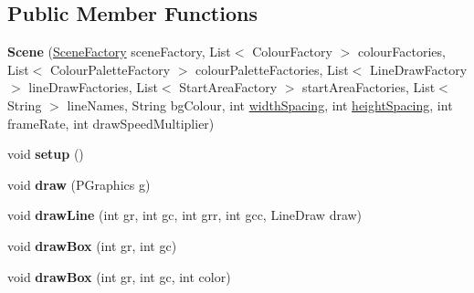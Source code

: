 \subsection*{Public Member Functions}
\begin{DoxyCompactItemize}
\item 
\hypertarget{classdev_1_1boxy_1_1fortyfive_1_1core_1_1scene_1_1_scene_a4603ede4e8c9a251e5af2efc78b9ab2f}{
{\bfseries Scene} (\hyperlink{classdev_1_1boxy_1_1fortyfive_1_1core_1_1scene_1_1_scene_factory}{SceneFactory} sceneFactory, List$<$ ColourFactory $>$ colourFactories, List$<$ ColourPaletteFactory $>$ colourPaletteFactories, List$<$ LineDrawFactory $>$ lineDrawFactories, List$<$ StartAreaFactory $>$ startAreaFactories, List$<$ String $>$ lineNames, String bgColour, int \hyperlink{group__scene_ga8116f4feebb544338d5cb2bb2f069cba}{widthSpacing}, int \hyperlink{group__scene_ga8b7cd33813c77386f79af2e54ba7ed34}{heightSpacing}, int frameRate, int drawSpeedMultiplier)}
\label{d6/d2d/classdev_1_1boxy_1_1fortyfive_1_1core_1_1scene_1_1_scene_a4603ede4e8c9a251e5af2efc78b9ab2f}

\item 
\hypertarget{classdev_1_1boxy_1_1fortyfive_1_1core_1_1scene_1_1_scene_a43ff077465b125c3b63a542c7b0ab126}{
void {\bfseries setup} ()}
\label{d6/d2d/classdev_1_1boxy_1_1fortyfive_1_1core_1_1scene_1_1_scene_a43ff077465b125c3b63a542c7b0ab126}

\item 
\hypertarget{classdev_1_1boxy_1_1fortyfive_1_1core_1_1scene_1_1_scene_a07429e4ce0c5d2d058e3b51f06679bce}{
void {\bfseries draw} (PGraphics g)}
\label{d6/d2d/classdev_1_1boxy_1_1fortyfive_1_1core_1_1scene_1_1_scene_a07429e4ce0c5d2d058e3b51f06679bce}

\item 
\hypertarget{classdev_1_1boxy_1_1fortyfive_1_1core_1_1scene_1_1_scene_a74934f8874ddd9c1d9cfd52067968406}{
void {\bfseries drawLine} (int gr, int gc, int grr, int gcc, LineDraw draw)}
\label{d6/d2d/classdev_1_1boxy_1_1fortyfive_1_1core_1_1scene_1_1_scene_a74934f8874ddd9c1d9cfd52067968406}

\item 
\hypertarget{classdev_1_1boxy_1_1fortyfive_1_1core_1_1scene_1_1_scene_a823856e252c7b7a529bfa5b26c4d6a8c}{
void {\bfseries drawBox} (int gr, int gc)}
\label{d6/d2d/classdev_1_1boxy_1_1fortyfive_1_1core_1_1scene_1_1_scene_a823856e252c7b7a529bfa5b26c4d6a8c}

\item 
\hypertarget{classdev_1_1boxy_1_1fortyfive_1_1core_1_1scene_1_1_scene_aac966e3aa0299d73d20190335a1631c6}{
void {\bfseries drawBox} (int gr, int gc, int color)}
\label{d6/d2d/classdev_1_1boxy_1_1fortyfive_1_1core_1_1scene_1_1_scene_aac966e3aa0299d73d20190335a1631c6}


\end{DoxyCompactItemize}
